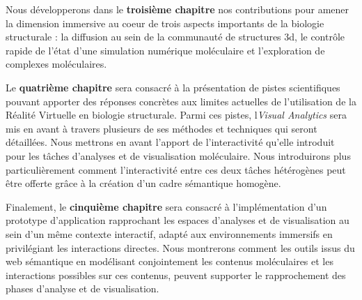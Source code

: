 Nous développerons dans le \textbf{troisième chapitre} nos contributions pour amener la dimension immersive au coeur de trois aspects importants de la biologie structurale : la diffusion au sein de la communauté de structures 3d, le contrôle rapide de l'état d'une simulation numérique moléculaire et l'exploration de complexes moléculaires.

Le \textbf{quatrième chapitre} sera consacré à la présentation de pistes scientifiques pouvant apporter des réponses concrètes aux limites actuelles de l'utilisation de la Réalité Virtuelle en biologie structurale. Parmi ces pistes, l\textit{Visual Analytics} sera mis en avant à travers plusieurs de ses méthodes et techniques qui seront détaillées. Nous mettrons en avant l'apport de l'interactivité qu'elle introduit pour les tâches d'analyses et de visualisation moléculaire. Nous introduirons plus particulièrement comment l'interactivité entre ces deux tâches hétérogènes peut être offerte grâce à la création d'un cadre sémantique homogène. 

Finalement, le \textbf{cinquième chapitre} sera consacré à l'implémentation d'un prototype d'application rapprochant les espaces d'analyses et de visualisation au sein d'un même contexte interactif, adapté aux environnements immersifs en privilégiant les interactions directes. Nous montrerons comment les outils issus du web sémantique en modélisant conjointement les contenus moléculaires et les interactions possibles sur ces contenus, peuvent supporter le rapprochement des phases d'analyse et de visualisation. 